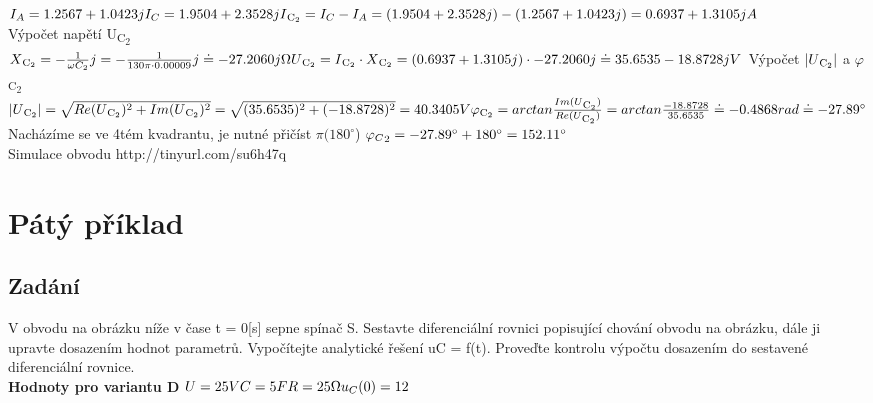 \documentclass[12pt,a4paper]{article} %
\begin{document}
	\medskip
	\(
	\\I_A = 1.2567 + 1.0423j
	\medskip
	\\I_C = 1.9504 + 2.3528j
	\medskip
	\\I\textsubscript{C\textsubscript{2}} = I_C - I_A = (1.9504 + 2.3528j) - (1.2567 + 1.0423j) = 0.6937 + 1.3105j A
	\medskip
	\)
	\\Výpočet napětí U\textsubscript{C\textsubscript{2}}
	\medskip
	\(
	\\X\textsubscript{C\textsubscript{2}} = - \frac{1}{\omega C_2}j = - \frac{1}{130\pi \cdot 0.00009}j \doteq -27.2060j \Omega
	\medskip
	\\U\textsubscript{C\textsubscript{2}} = I\textsubscript{C\textsubscript{2}} \cdot X\textsubscript{C\textsubscript{2}} = (0.6937 + 1.3105j) \cdot -27.2060j \doteq 35.6535 -18.8728j V
	\bigskip
	\)
	Výpočet $|U\textsubscript{C\textsubscript{2}}|$ a $\varphi$\textsubscript{C\textsubscript{2}}
	\medskip
	\(
	\\|U\textsubscript{C\textsubscript{2}}| = \sqrt{Re(U\textsubscript{C\textsubscript{2}})^2 + Im(U\textsubscript{C\textsubscript{2}})^2} = \sqrt{(35.6535)^2 + (-18.8728)^2} = 40.3405V
	\medskip
	\\\varphi\textsubscript{C\textsubscript{2}} = arctan\frac{Im(U\textsubscript{C\textsubscript{2}})}{Re(U\textsubscript{C\textsubscript{2}})} = arctan \frac{-18.8728}{35.6535} \doteq -0.4868 rad \doteq -27.89^{\circ}
	\)
	\medskip
	\\Nacházíme se ve 4tém kvadrantu, je nutné přičíst $\pi(180^{\circ}$)
	\(
	\\{\varphi_C}_2 = -27.89^{\circ} + 180^{\circ} = 152.11^{\circ}
	\)
	\medskip
	\\Simulace obvodu http://tinyurl.com/su6h47q
	\clearpage

	\section{Pátý příklad} %
		\subsection*{Zadání}
        V obvodu na obrázku níže v čase t = 0[s] sepne spínač S. Sestavte diferenciální  rovnici popisující chování obvodu na obrázku, dále ji upravte dosazením hodnot parametrů. Vypočítejte analytické řešení uC = f(t). Proveďte
        kontrolu výpočtu dosazením do sestavené diferenciální rovnice.
        \\\textbf{Hodnoty pro variantu D}
		\(
		\\U = 25V
		\\C = 5 F
		\\R = 25 \Omega
		\\u_C(0) = 12
        \)
        
\end{document}
